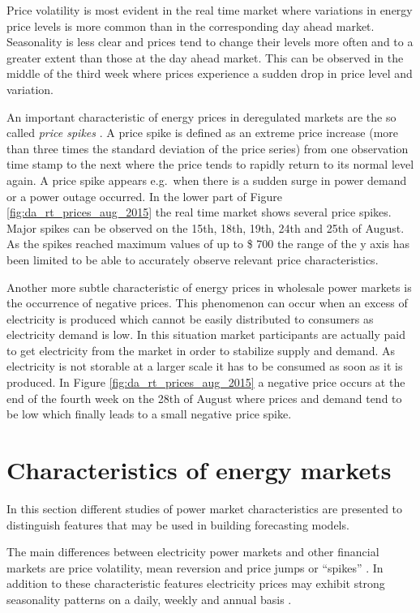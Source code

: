 Price volatility is most evident in the real time market where variations in energy price levels is more common than in the corresponding day ahead market. Seasonality is less clear and prices tend to change their levels more often and to a greater extent than those at the day ahead market. This can be observed in the middle of the third week where prices experience a sudden drop in price level and variation. 

An important characteristic of energy prices in deregulated markets are the so called \textit{price spikes} \cite{weron2004modelingmarkets}. A price spike is defined as an extreme price increase (more than three times the standard deviation of the price series) from one observation time stamp to the next where the price tends to rapidly return to its normal level again. 
A price spike appears e.g.~when there is a sudden surge in power demand or a power outage occurred. In the lower part of Figure \ref{fig:da_rt_prices_aug_2015} the real time market shows several price spikes. Major spikes can be observed on the 15th, 18th, 19th, 24th and 25th of August. As the spikes reached maximum values of up to \$ 700 the range of the y axis has been limited to be able to accurately observe relevant price characteristics. 

Another more subtle characteristic of energy prices in wholesale power markets is the occurrence of negative prices. This phenomenon can occur when an excess of electricity is produced which cannot be easily distributed to consumers as electricity demand is low. In this situation market participants are actually paid to get electricity from the market in order to stabilize supply and demand. As electricity is not storable at a larger scale it has to be consumed as soon as it is produced. 
In Figure \ref{fig:da_rt_prices_aug_2015} a negative price occurs at the end of the fourth week on the 28th of August where prices and demand tend to be low which finally leads to a small negative price spike. 



\section{Characteristics of energy markets} \label{sec:characteristics_of_energy_markets}

In this section different studies of power market characteristics are presented to distinguish features that may be used in building forecasting models. 


The main differences between electricity power markets and other financial markets are price volatility, mean reversion and price jumps or "`spikes"' \cite{weron2007modeling,weron2008market,weron2004modelingmarkets}. In addition to these characteristic features electricity prices may exhibit strong seasonality patterns on a daily, weekly and annual basis \cite{weron2004modelingmarkets}. 

